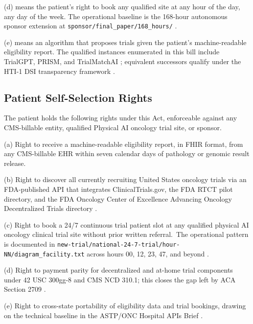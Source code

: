 (d)  means the patient's right to book any
qualified site at any hour of the day, any day of the week. The
operational baseline is the 168-hour autonomous sponsor extension at
\texttt{sponsor/final\_paper/168\_hours/} \cite{kawchak_2026_19396256}.

(e)  means an algorithm that proposes
trials given the patient's machine-readable eligibility report. The
qualified instances enumerated in this bill include TrialGPT, PRISM,
and TrialMatchAI \cite{jin2024trialgpt, gupta2024prism,
abdallah2026trialmatchai}; equivalent successors qualify under the
HTI-1 DSI transparency framework \cite{hti1_dsi_fact_sheet_2023}.

\subsection{Patient Self-Selection Rights}

\hspace{0.5cm} The patient holds the following rights under this Act, enforceable
against any CMS-billable entity, qualified Physical AI oncology trial
site, or sponsor.

(a) Right to receive a machine-readable eligibility report, in FHIR
format, from any CMS-billable EHR within seven calendar days of
pathology or genomic result release.

(b) Right to discover all currently recruiting United States oncology
trials via an FDA-published API that integrates ClinicalTrials.gov,
the FDA RTCT pilot directory, and the FDA Oncology Center of
Excellence Advancing Oncology Decentralized Trials directory
\cite{fda_oce_advancing_oncology_dct_2024, fda_rtct_press_2026}.

(c) Right to book a 24/7 continuous trial patient slot at any qualified physical AI oncology clinical trial site without
prior written referral.\ The operational pattern is documented in
\texttt{new-trial/national-24-7-trial/hour-NN/diagram\_facility.txt}
across hours 00, 12, 23, 47, and beyond \cite{kawchak_2026_19994945}.

(d) Right to payment parity for decentralized and at-home trial
components under 42 USC 300gg-8 and CMS NCD 310.1; this closes the
gap left by ACA Section 2709 \cite{usc_300gg8_clinical_trials,
cms_ncd_3101_routine_costs}.

(e) Right to cross-state portability of eligibility data and trial
bookings, drawing on the technical baseline in the ASTP/ONC Hospital
APIs Brief \cite{astp_onc_hospital_apis_2024}.

